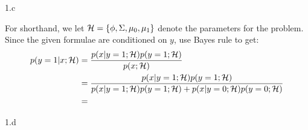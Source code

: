 \LARGE
1.c
\normalsize

\begin{answer}
  For shorthand, we let $\mathcal{H} = \{\phi, \Sigma, \mu_{0}, \mu_1\}$ denote
  the parameters for the problem.
  Since the given formulae are conditioned on $y$, use Bayes rule to get:
  \begin{align*}
    p(y =1\vert  x ; \mathcal{H}) &= \frac {p(x\vert y=1; \mathcal{H}) p(y=1; \mathcal{H})} {p(x; \mathcal{H})}\\
    & = \frac {p(x\vert y=1; \mathcal{H}) p(y=1; \mathcal{H})}
      {p(x\vert y=1; \mathcal{H}) p(y=1; \mathcal{H}) + p(x\vert y={0}; \mathcal{H}) p(y={0};
      \mathcal{H})}\\
    &=\\
  \end{align*}
\end{answer}
\clearpage

\LARGE
1.d
\normalsize

